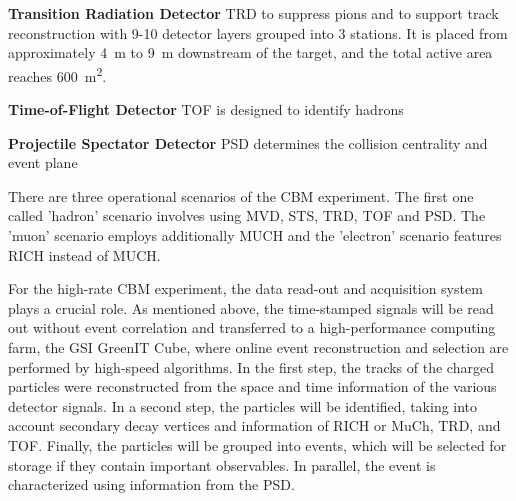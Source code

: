 \textbf{Transition Radiation Detector} \gls{TRD} to suppress pions and to support track reconstruction with 9-10 detector layers grouped into 3 stations. It is placed from approximately \SI{4}{\metre} to \SI{9}{\metre} downstream of the target, and the total active area reaches \SI{600}{\square\metre}. 

\textbf{Time-of-Flight Detector} \gls{TOF} is designed to identify hadrons

\textbf{Projectile Spectator Detector} \gls{PSD} determines the collision centrality and event plane

There are three operational scenarios of the \gls{CBM} experiment. 
The first one called 'hadron' scenario involves using MVD, STS, TRD, TOF and PSD. The 'muon' scenario employs additionally MUCH and the 'electron' scenario features RICH instead of MUCH. 


For the high-rate CBM experiment, the data read-out and acquisition system plays a crucial role. As mentioned above, the time-stamped signals will be read out without event correlation and transferred to a high-performance computing farm, the GSI GreenIT Cube, where online event reconstruction and selection are performed by high-speed algorithms. In the first step, the tracks of the charged particles were reconstructed from the space and time information of the various detector signals. In a second step, the particles will be identified, taking into account secondary decay vertices and information of RICH or MuCh, TRD, and TOF. Finally, the particles will be grouped into events, which will be selected for storage if they contain important observables. In parallel, the event is characterized using information from the PSD.



